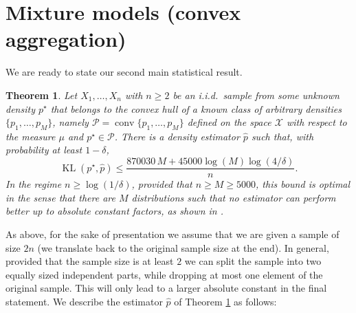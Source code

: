 \documentclass[11pt]{article}
\renewcommand{\le}{\leqslant}
\renewcommand{\ge}{\geqslant}
\newcommand{\M}{M}
\newcommand{\X}{\mathcal{X}}
\newcommand{\kl}{\operatorname{KL}}
\newtheorem{theorem}{Theorem}
\theoremstyle{definition}
\theoremstyle{remark}
\begin{document}
\section{Mixture models (convex aggregation)}\label{sec:mixture-models}
We are ready to state our second main statistical result.
\begin{theorem}
\label{thm:convexaggregation}
    Let $X_{1}, \ldots, X_n$ with $n \ge 2$ be an i.i.d.\ sample from some unknown density $p^\star$ that belongs to the convex hull of a known class of arbitrary densities $\{p_1, \ldots, p_\M\}$, namely $\mathcal{P} = \operatorname{conv}\{p_1, \ldots, p_\M\}$ defined on the space $\X$ with respect to the measure $\mu$ and $p^\star \in \mathcal P$. There is a density estimator $\widehat{p}$ such that, with probability at least $1 - \delta$,
    \[
    \kl\left(p^\star, \widehat{p}\right) \le \frac{870030\,M + 45000\log(M)\log\left(4/\delta\right)}{n}.
    \]
In the regime $n \ge \log(1/\delta)$, provided that $n \ge M \ge 5000$, this bound is optimal in the sense that there are $\M$ distributions such that no estimator can perform better up to absolute constant factors, as shown in \cite[Theorem 4]{mourtada2025estimation}. 
\end{theorem}
As above, for the sake of presentation we assume that we are given a sample of size $2n$ (we translate back to the original sample size at the end). In general, provided that the sample size is at least $2$ we can split the sample into two equally sized independent parts, while dropping at most one element of the original sample. This will only lead to a larger absolute constant in the final statement. We describe the estimator $\widehat{p}$ of Theorem \ref{thm:convexaggregation} as follows:
\end{document}
